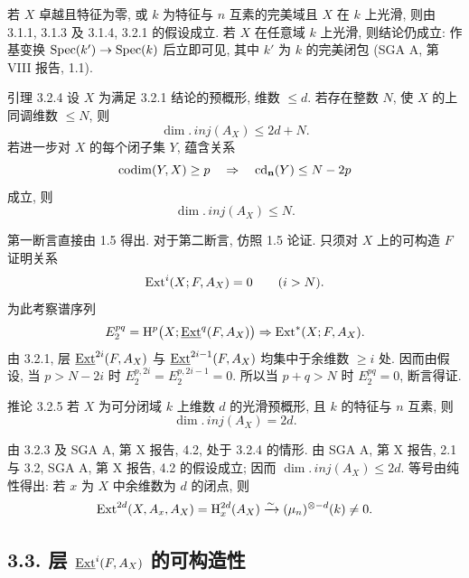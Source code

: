 \begin{prooftext}
若 $X$ 卓越且特征为零, 或 $k$ 为特征与 $n$ 互素的完美域且 $X$ 在 $k$ 上光滑, 则由 3.1.1, 3.1.3 及 3.1.4, 3.2.1 的假设成立. 若 $X$ 在任意域 $k$ 上光滑, 则结论仍成立: 作基变换 $\operatorname{Spec}(k')\to\operatorname{Spec}(k)$ 后立即可见, 其中 $k'$ 为 $k$ 的完美闭包 (SGA A, 第 VIII 报告, 1.1). \qedtext
\end{prooftext}

\begin{statement}{引理 3.2.4}
设 $X$ 为满足 3.2.1 结论的预概形, 维数 $\le d$. 若存在整数 $N$, 使 $X$ 的上同调维数 $\le N$, 则
\[
   \dim.\,inj(A_X)\le 2d+N.
\]
若进一步对 $X$ 的每个闭子集 $Y$, 蕴含关系
\[
   \operatorname{codim}(Y,X)\ge p \quad\Rightarrow\quad \operatorname{cd}_{\mathbf n}(Y)\le N-2p
\]
成立, 则
\[
   \dim.\,inj(A_X)\le N.
\]
\end{statement}

\begin{prooftext}
第一断言直接由 1.5 得出. 对于第二断言, 仿照 1.5 论证. 只须对 $X$ 上的可构造 $F$ 证明关系
\[
   \operatorname{Ext}^i(X;F,A_X)=0\qquad(i>N).
\]
为此考察谱序列
\[
   E_2^{pq}=\mathrm{H}^p\bigl(X;\underline{\operatorname{Ext}}^q(F,A_X)\bigr)
      \Rightarrow \operatorname{Ext}^*(X;F,A_X).
\]
由 3.2.1, 层 $\underline{\operatorname{Ext}}^{2i}(F,A_X)$ 与 $\underline{\operatorname{Ext}}^{2i-1}(F,A_X)$ 均集中于余维数 $\ge i$ 处. 因而由假设, 当 $p>N-2i$ 时 $E_2^{p,2i}=E_2^{p,2i-1}=0$. 所以当 $p+q>N$ 时 $E_2^{pq}=0$, 断言得证. \qedtext
\end{prooftext}

\begin{statement}{推论 3.2.5}
若 $X$ 为可分闭域 $k$ 上维数 $d$ 的光滑预概形, 且 $k$ 的特征与 $n$ 互素, 则
\[
   \dim.\,inj(A_X)=2d.
\]
\end{statement}

\begin{prooftext}
由 3.2.3 及 SGA A, 第 X 报告, 4.2, 处于 3.2.4 的情形. 由 SGA A, 第 X 报告, 2.1 与 3.2, SGA A, 第 X 报告, 4.2 的假设成立; 因而 $\dim.\,inj(A_X)\le2d$. 等号由纯性得出: 若 $x$ 为 $X$ 中余维数为 $d$ 的闭点, 则
\[
   \operatorname{Ext}^{2d}(X,A_x,A_X)=\mathrm{H}^{2d}_x(A_X)
      \xrightarrow{\sim}(\mu_n)^{\otimes -d}(k)\ne0.
\]
\qedtext
\end{prooftext}

\subsection*{3.3. 层 $\underline{\operatorname{Ext}}^i(F,A_X)$ 的可构造性}

